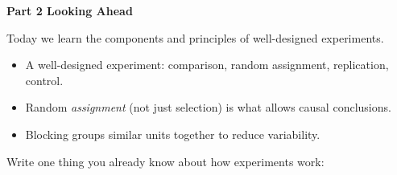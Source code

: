 \documentclass[10pt]{article}
\begin{document}
{\large\bfseries\color{navy} Part 2 \quad Looking Ahead}

\vspace{0.12in}

\noindent Today we learn the components and principles of well-designed experiments.

\vspace{0.14in}

\begin{tcolorbox}[colback=greenbg, colframe=greenacc, boxrule=0.8pt, arc=2mm,
    left=4mm, right=4mm, top=3mm, bottom=3mm]
    \small
    \begin{itemize}[leftmargin=1.3em, itemsep=8pt]
  \item A well-designed experiment: comparison, random assignment, replication, control.
  \item Random \emph{assignment} (not just selection) is what allows causal conclusions.
  \item Blocking groups similar units together to reduce variability.
    \end{itemize}
\end{tcolorbox}

\vspace{0.2in}

\noindent\textcolor{slate}{\small Write one thing you already know about how experiments
work:}\\[8pt]
\writeline\\[2pt]\writeline
\end{document}
